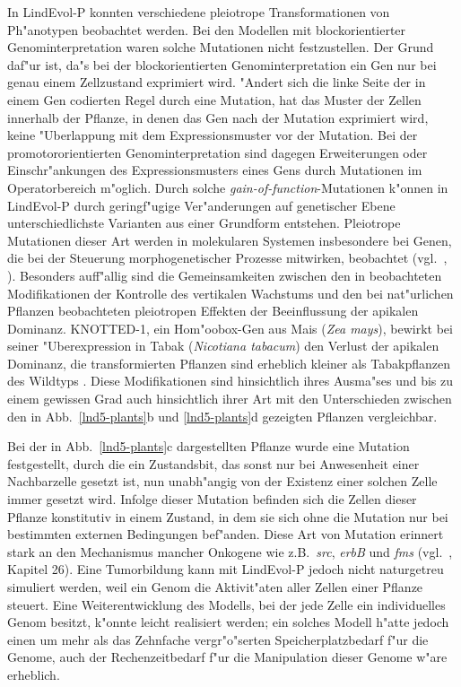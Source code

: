 In LindEvol-P konnten verschiedene pleiotrope Transformationen von Ph"anotypen beobachtet werden. Bei den Modellen mit
blockorientierter Genominterpretation waren solche Mutationen nicht festzustellen. Der Grund daf"ur ist, da"s bei der
blockorientierten Genominterpretation ein Gen nur bei genau einem Zellzustand exprimiert wird. "Andert sich die linke
Seite der in einem Gen codierten Regel durch eine Mutation, hat das Muster der Zellen innerhalb der Pflanze, in denen
das Gen nach der Mutation exprimiert wird, keine "Uberlappung mit dem Expressionsmuster vor der Mutation. Bei der
promotororientierten Genominterpretation sind dagegen Erweiterungen oder Einschr"ankungen des Expressionsmusters
eines Gens durch Mutationen im Operatorbereich m"oglich. Durch solche \textsl{gain-of-function}-Mutationen k"onnen
in LindEvol-P durch geringf"ugige Ver"anderungen auf genetischer Ebene unterschiedlichste Varianten aus einer Grundform
entstehen. Pleiotrope Mutationen dieser Art werden in molekularen Systemen insbesondere bei Genen, die bei der Steuerung
morphogenetischer Prozesse mitwirken, beobachtet (vgl.\ \cite{Carroll95}, \cite{Watson}). Besonders auff"allig sind
die Gemeinsamkeiten zwischen den in  beobachteten Modifikationen der Kontrolle des vertikalen Wachstums und
den bei nat"urlichen Pflanzen beobachteten pleiotropen Effekten der Beeinflussung der apikalen Dominanz. KNOTTED-1,
ein Hom"oobox-Gen aus Mais (\textsl{Zea mays}), bewirkt bei seiner "Uberexpression in Tabak (\textsl{Nicotiana tabacum})
den Verlust der apikalen Dominanz, die transformierten Pflanzen sind erheblich kleiner als Tabakpflanzen des Wildtyps \cite{Sinha95}.
Diese Modifikationen sind hinsichtlich ihres Ausma"ses und bis zu einem gewissen Grad auch
hinsichtlich ihrer Art mit den Unterschieden zwischen den in Abb.\ \ref{lnd5-plants}b und \ref{lnd5-plants}d gezeigten
Pflanzen vergleichbar.

Bei der in Abb.\ \ref{lnd5-plants}c dargestellten Pflanze wurde eine Mutation festgestellt, durch die ein Zustandsbit,
das sonst nur bei Anwesenheit einer Nachbarzelle gesetzt ist, nun unabh"angig von der Existenz einer solchen Zelle immer
gesetzt wird. Infolge dieser Mutation befinden sich die Zellen dieser Pflanze konstitutiv in einem Zustand, in dem sie sich ohne
die Mutation nur bei bestimmten externen Bedingungen bef"anden. Diese Art von Mutation erinnert stark an den Mechanismus
mancher Onkogene wie z.B.\ \textsl{src}, \textsl{erbB} und \textsl{fms} (vgl.\ \cite{Watson}, Kapitel 26). Eine Tumorbildung
kann mit LindEvol-P jedoch nicht naturgetreu simuliert werden, weil ein Genom die Aktivit"aten aller Zellen einer Pflanze
steuert. Eine Weiterentwicklung des Modells, bei der jede Zelle ein individuelles Genom besitzt, k"onnte leicht realisiert
werden; ein solches Modell h"atte jedoch einen um mehr als das Zehnfache vergr"o"serten Speicherplatzbedarf f"ur die Genome,
auch der Rechenzeitbedarf f"ur die Manipulation dieser Genome w"are erheblich.

